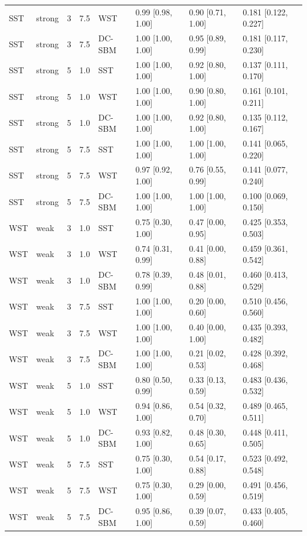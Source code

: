 \begin{table}
\begin{tabular}[t]{llrrllll}
SST & strong & 3 & 7.5 & WST & 0.99 [0.98, 1.00] & 0.90 [0.71, 1.00] & 0.181 [0.122, 0.227]\\
SST & strong & 3 & 7.5 & DC-SBM & 1.00 [1.00, 1.00] & 0.95 [0.89, 0.99] & 0.181 [0.117, 0.230]\\
SST & strong & 5 & 1.0 & SST & 1.00 [1.00, 1.00] & 0.92 [0.80, 1.00] & 0.137 [0.111, 0.170]\\
SST & strong & 5 & 1.0 & WST & 1.00 [1.00, 1.00] & 0.90 [0.80, 1.00] & 0.161 [0.101, 0.211]\\
\addlinespace
SST & strong & 5 & 1.0 & DC-SBM & 1.00 [1.00, 1.00] & 0.92 [0.80, 1.00] & 0.135 [0.112, 0.167]\\
SST & strong & 5 & 7.5 & SST & 1.00 [1.00, 1.00] & 1.00 [1.00, 1.00] & 0.141 [0.065, 0.220]\\
SST & strong & 5 & 7.5 & WST & 0.97 [0.92, 1.00] & 0.76 [0.55, 0.99] & 0.141 [0.077, 0.240]\\
SST & strong & 5 & 7.5 & DC-SBM & 1.00 [1.00, 1.00] & 1.00 [1.00, 1.00] & 0.100 [0.069, 0.150]\\
WST & weak & 3 & 1.0 & SST & 0.75 [0.30, 1.00] & 0.47 [0.00, 0.95] & 0.425 [0.353, 0.503]\\
\addlinespace
WST & weak & 3 & 1.0 & WST & 0.74 [0.31, 0.99] & 0.41 [0.00, 0.88] & 0.459 [0.361, 0.542]\\
WST & weak & 3 & 1.0 & DC-SBM & 0.78 [0.39, 0.99] & 0.48 [0.01, 0.88] & 0.460 [0.413, 0.529]\\
WST & weak & 3 & 7.5 & SST & 1.00 [1.00, 1.00] & 0.20 [0.00, 0.60] & 0.510 [0.456, 0.560]\\
WST & weak & 3 & 7.5 & WST & 1.00 [1.00, 1.00] & 0.40 [0.00, 1.00] & 0.435 [0.393, 0.482]\\
WST & weak & 3 & 7.5 & DC-SBM & 1.00 [1.00, 1.00] & 0.21 [0.02, 0.53] & 0.428 [0.392, 0.468]\\
\addlinespace
WST & weak & 5 & 1.0 & SST & 0.80 [0.50, 0.99] & 0.33 [0.13, 0.59] & 0.483 [0.436, 0.532]\\
WST & weak & 5 & 1.0 & WST & 0.94 [0.86, 1.00] & 0.54 [0.32, 0.70] & 0.489 [0.465, 0.511]\\
WST & weak & 5 & 1.0 & DC-SBM & 0.93 [0.82, 1.00] & 0.48 [0.30, 0.65] & 0.448 [0.411, 0.505]\\
WST & weak & 5 & 7.5 & SST & 0.75 [0.30, 1.00] & 0.54 [0.17, 0.88] & 0.523 [0.492, 0.548]\\
WST & weak & 5 & 7.5 & WST & 0.75 [0.30, 1.00] & 0.29 [0.00, 0.59] & 0.491 [0.456, 0.519]\\
\addlinespace
WST & weak & 5 & 7.5 & DC-SBM & 0.95 [0.86, 1.00] & 0.39 [0.07, 0.59] & 0.433 [0.405, 0.460]\\

\end{tabular}
\end{table}
